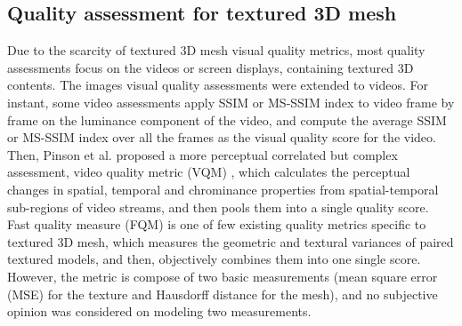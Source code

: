 \subsection{Quality assessment for textured 3D mesh}
Due to the scarcity of textured 3D mesh visual quality metrics, most quality assessments focus on the videos or screen displays, containing textured 3D contents. The images visual quality assessments were extended to videos\cite{Seshadrinathan_2010}. For instant, some video assessments \cite{Zhou_Wang} apply SSIM or MS-SSIM index to video frame by frame on the luminance component of the video, and compute the average SSIM or MS-SSIM index over all the frames as the visual quality score for the video. Then, Pinson et al. proposed a more perceptual correlated but complex assessment, video quality metric (VQM) \cite{Pinson_2004}, which calculates the perceptual changes in spatial, temporal and chrominance properties from spatial-temporal sub-regions of video streams, and then pools them into a single quality score.  Fast quality measure (FQM) \cite{Tian_2004} is one of few existing quality metrics specific to textured 3D mesh, which measures the geometric and textural variances of paired textured models, and then, objectively combines them into one single score. However, the metric is compose of two basic measurements (mean square error (MSE) for the texture and Hausdorff distance for the mesh), and no subjective opinion was considered on modeling two measurements.
